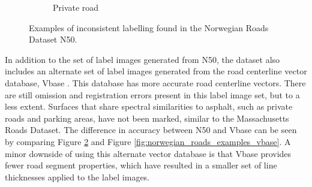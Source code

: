 \begin{figure}[h]
\begin{subfigure}{0.31\textwidth}
\caption{Private road} \label{fig:norwegian_roads_missing_n50}
\end{subfigure}
\hspace*{\fill} %
\caption[Inconsistent labelling in Norwegian Roads Dataset N50]{Examples of inconsistent labelling found in the Norwegian Roads Dataset N50.} \label{fig:norwegian_roads_examples_n50}
\end{figure}

In addition to the set of label images generated from N50, the dataset also includes an alternate set of label images generated from the road centerline vector database, Vbase \citep{Kartverket_vbase}. This database has more accurate road centerline vectors. There are still omission and registration errors present in this label image set, but to a less extent. Surfaces that share spectral similarities to asphalt, such as private roads and parking areas, have not been marked, similar to the Massachusetts Roads Dataset. The difference in accuracy between N50 and Vbase can be seen by comparing Figure \ref{fig:norwegian_roads_examples_n50} and Figure \ref{fig:norwegian_roads_examples_vbase}. A minor downside of using this alternate vector database is that Vbase provides fewer road segment properties, which have resulted in a smaller set of line thicknesses applied to the label images.\\

